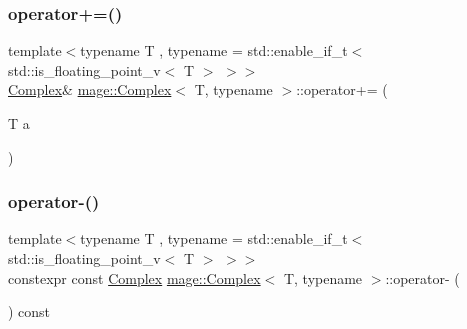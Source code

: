 \subsubsection{\texorpdfstring{operator+=()}{operator+=()}\hspace{0.1cm}{\footnotesize\ttfamily [2/2]}}
{\footnotesize\ttfamily template$<$typename T , typename  = std\+::enable\+\_\+if\+\_\+t$<$ std\+::is\+\_\+floating\+\_\+point\+\_\+v$<$ T $>$ $>$$>$ \\
\mbox{\hyperlink{structmage_1_1_complex}{Complex}}\& \mbox{\hyperlink{structmage_1_1_complex}{mage\+::\+Complex}}$<$ T, typename $>$\+::operator+= (\begin{DoxyParamCaption}\item[{T}]{a }\end{DoxyParamCaption})\hspace{0.3cm}{\ttfamily [noexcept]}}

\mbox{\label{structmage_1_1_complex_a921d25c86b2e820c711841d96f0b2576}} 
\subsubsection{\texorpdfstring{operator-\/()}{operator-()}\hspace{0.1cm}{\footnotesize\ttfamily [1/3]}}
{\footnotesize\ttfamily template$<$typename T , typename  = std\+::enable\+\_\+if\+\_\+t$<$ std\+::is\+\_\+floating\+\_\+point\+\_\+v$<$ T $>$ $>$$>$ \\
constexpr const \mbox{\hyperlink{structmage_1_1_complex}{Complex}} \mbox{\hyperlink{structmage_1_1_complex}{mage\+::\+Complex}}$<$ T, typename $>$\+::operator-\/ (\begin{DoxyParamCaption}{ }\end{DoxyParamCaption}) const\hspace{0.3cm}{\ttfamily [noexcept]}}

\mbox{\label{structmage_1_1_complex_aa33adb258ed9e501040ff923ee75e4b1}} 
